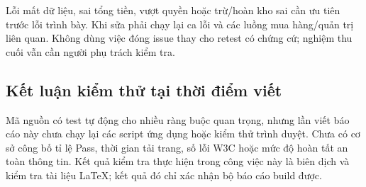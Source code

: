 Lỗi mất dữ liệu, sai tổng tiền, vượt quyền hoặc trừ/hoàn kho sai cần ưu tiên trước lỗi trình bày. Khi sửa phải chạy lại ca lỗi và các luồng mua hàng/quản trị liên quan. Không dùng việc đóng issue thay cho retest có chứng cứ; nghiệm thu cuối vẫn cần người phụ trách kiểm tra.

\subsection{Kết luận kiểm thử tại thời điểm viết}
Mã nguồn có test tự động cho nhiều ràng buộc quan trọng, nhưng lần viết báo cáo này chưa chạy lại các script ứng dụng hoặc kiểm thử trình duyệt. Chưa có cơ sở công bố tỉ lệ Pass, thời gian tải trang, số lỗi W3C hoặc mức độ hoàn tất an toàn thông tin. Kết quả kiểm tra thực hiện trong công việc này là biên dịch và kiểm tra tài liệu LaTeX; kết quả đó chỉ xác nhận bộ báo cáo build được.
\clearpage

